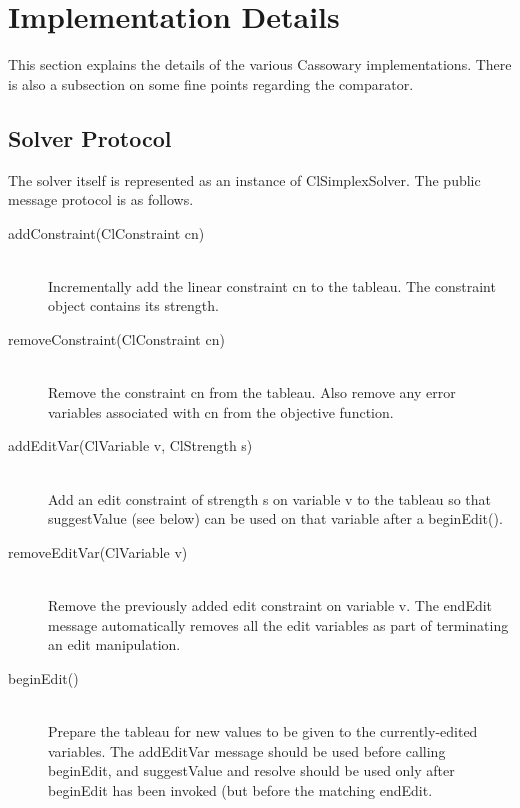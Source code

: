 \documentclass{article}
\begin{document}
\section{Implementation Details}
\label{cassowary-details}

This section explains the details of the various Cassowary
implementations. There is also a subsection on some fine points
regarding the comparator.

\subsection{Solver Protocol}
\label{solver-protocol}

The solver itself is represented as an instance of {\sf ClSimplexSolver}.
The public message protocol is as follows.

\begin{description}

\item[{\sf addConstraint(ClConstraint cn)}] \ \\
Incrementally add the linear constraint {\sf cn} to the tableau.  The
constraint object contains its strength.

\item[{\sf removeConstraint(ClConstraint cn)}] \ \\
Remove the constraint {\sf cn} from the tableau.  Also remove 
any error variables associated with {\sf cn} from the objective function.


\item[{\sf addEditVar(ClVariable v, ClStrength s)}] \ \\
      Add an edit constraint of strength {\sf s} on variable {\sf v} to
      the tableau so that {\sf suggestValue} (see below) can be used on
      that variable after a {\sf beginEdit()}.
      

\item[{\sf removeEditVar(ClVariable v)}] \ \\
      Remove the previously added edit constraint on variable {\sf v}.
      The {\sf endEdit} message automatically removes all the edit
      variables as part of terminating an edit manipulation.
      

\item[{\sf beginEdit()}] \ \\
      Prepare the tableau for new values to be given to the
      currently-edited variables.  The {\sf addEditVar} message should
      be used before calling {\sf beginEdit}, and {\sf suggestValue} and
      {\sf resolve} should be used only after {\sf beginEdit} has been
      invoked (but before the matching {\sf endEdit}.
      


\end{description}
\end{document}
